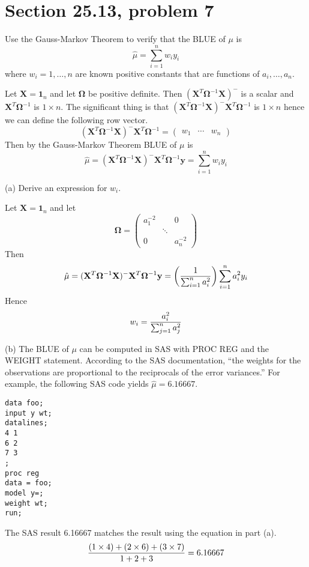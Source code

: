 \section{Section 25.13, problem 7}
Use the Gauss-Markov Theorem to verify that the BLUE of $\mu$ is
\[
\hat\mu=\sum_{i=1}^nw_iy_i
\]
where $w_i=1,\ldots,n$ are known positive constants that are
functions of $a_i,\ldots,a_n$.

\bigskip
\noindent
Let $\mathbf X=\mathbf 1_n$ and let $\bm\Omega$ be positive
definite.
Then $(\mathbf X^T\bm\Omega^{-1}\mathbf X)^{-{}}$ is a scalar
and $\mathbf X^T\bm\Omega^{-1}$ is $1\times n$.
The significant thing is that
$(\mathbf X^T\bm\Omega^{-1}\mathbf X)^{-{}}\mathbf X^T\bm\Omega^{-1}$
is $1\times n$ hence we can define the following row vector.
\[
(\mathbf X^T\bm\Omega^{-1}\mathbf X)^{-{}}\mathbf X^T\bm\Omega^{-1}
=\begin{pmatrix}w_1 & \cdots & w_n\end{pmatrix}
\]
Then by the Gauss-Markov Theorem BLUE of $\mu$ is
\[
\hat\mu=
(\mathbf X^T\bm\Omega^{-1}\mathbf X)^{-{}}\mathbf X^T\bm\Omega^{-1}
\mathbf y=\sum_{i=1}^nw_iy_i
\]

\bigskip
\noindent
(a) Derive an expression for $w_i$.

\bigskip
\noindent
Let $\mathbf X=\mathbf 1_n$ and let
\[
\bm\Omega=
\begin{pmatrix}
a_1^{-2} & & 0\\
& \ddots \\
0 & & a_n^{-2}
\end{pmatrix}
\]
Then
\[
\hat\mu=
(\mathbf X^T\bm\Omega^{-1}\mathbf X)^{-{}}\mathbf X^T\bm\Omega^{-1}
\mathbf y=
\left({1\over\sum_{i=1}^na_i^2}\right)
\sum_{i=1}^na_i^2y_i
\]
Hence
\[
w_i={a_i^2\over\sum_{j=1}^na_j^2}
\]

\bigskip
\noindent
(b) The BLUE of $\mu$ can be computed in SAS with PROC REG and the
WEIGHT statement.
According to the SAS documentation, ``the weights for the
observations are proportional to the reciprocals of the
error variances.''
For example, the following SAS code yields $\hat\mu=6.16667$.
\begin{verbatim}
data foo;
input y wt;
datalines;
4 1
6 2
7 3
;
proc reg
data = foo;
model y=;
weight wt;
run;
\end{verbatim}
The SAS result 6.16667 matches the result using the equation in
part (a).
\[
{(1\times4)+(2\times6)+(3\times7)\over1+2+3}=6.16667
\]
